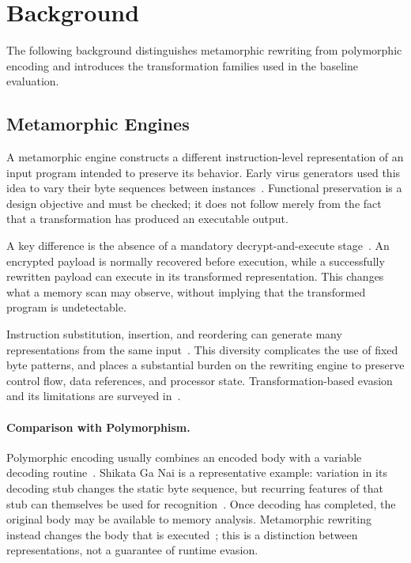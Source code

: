 \documentclass[runningheads]{llncs}
\begin{document}
\section{Background}\label{sec:background}

The following background distinguishes metamorphic rewriting from polymorphic encoding and introduces the transformation families used in the baseline evaluation.

\subsection{Metamorphic Engines}\label{sub:meth}
A metamorphic engine constructs a different instruction-level representation of an input program intended to preserve its behavior. Early virus generators used this idea to vary their byte sequences between instances~\cite{historycodeobf}. Functional preservation is a design objective and must be checked; it does not follow merely from the fact that a transformation has produced an executable output.

A key difference is the absence of a mandatory decrypt-and-execute stage~\cite{identifyingmeth}. An encrypted payload is normally recovered before execution, while a successfully rewritten payload can execute in its transformed representation. This changes what a memory scan may observe, without implying that the transformed program is undetectable.

Instruction substitution, insertion, and reordering can generate many representations from the same input~\cite{identifyingmeth,metworm}. This diversity complicates the use of fixed byte patterns, and places a substantial burden on the rewriting engine to preserve control flow, data references, and processor state. Transformation-based evasion and its limitations are surveyed in~\cite{PEsurveybible}.

\paragraph{Comparison with Polymorphism.}
Polymorphic encoding usually combines an encoded body with a variable decoding routine~\cite{historycodeobf}. Shikata Ga Nai is a representative example: variation in its decoding stub changes the static byte sequence, but recurring features of that stub can themselves be used for recognition~\cite{sgnstrong}. Once decoding has completed, the original body may be available to memory analysis. Metamorphic rewriting instead changes the body that is executed~\cite{codeExtraction}; this is a distinction between representations, not a guarantee of runtime evasion.
\end{document}
